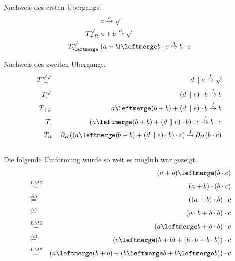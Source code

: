 \documentclass[10pt,a4paper,oneside,ngerman,numbers=noenddot]{scrartcl}
\begin{document}
    \subsection{}
    Nachweis des ersten Übergangs:
    \begin{alignat*}{2}
        &\; a \overset{a}{\rightarrow} \surd \\
        T^{\surd}_{+R} &\; a + b \overset{a}{\rightarrow} \surd \\
        T^{\surd}_{\leftmerge} &\; (a + b) \leftmerge b \cdot c \overset{a}{\rightarrow} b \cdot c
    \end{alignat*}

    Nachweis des zweiten Übergangs:
    \begin{alignat*}{2}
        T_{\parallel \gamma}^{\surd \surd} &&\; d \parallel e \overset{f}{\rightarrow} \surd \\
        T^{\surd}_{.} &&\; (d \parallel e) \cdot b \overset{f}{\rightarrow} b \\
        T_{+L} &&\; a \leftmerge (b + b) + (d \parallel e) \cdot b \overset{f}{\rightarrow} b \\
        T_{.} &&\; (a \leftmerge (b + b) + (d \parallel e) \cdot b) \cdot c \overset{f}{\rightarrow} b \cdot c \\
        T_{\partial} &&\; \partial_H((a \leftmerge (b + b) + (d \parallel e) \cdot b) \cdot c) \overset{f}{\rightarrow} \partial_H(b \cdot c)
    \end{alignat*}

    \subsection{}
    Die folgende Umformung wurde so weit es möglich war gezeigt.
    \begin{alignat*}{2}
        && (a + b) \leftmerge (b \cdot c) \\
        &\overset{LM2}{=}& (a + b) \cdot (b \cdot c) \\
        &\overset{A5}{=}& ((a + b) \cdot b) \cdot c \\
        &\overset{A4}{=}& (a \cdot b + b \cdot b) \cdot c \\
        &\overset{LM2}{=}& (a \leftmerge b + b \cdot b) \cdot c \\
        &\overset{A3}{=}& (a \leftmerge (b + b) + (b \cdot b + b \cdot b)) \cdot c \\
        &\overset{LM2}{=}& (a \leftmerge (b + b) + (b \leftmerge b + b \leftmerge b)) \cdot c
    \end{alignat*}
\end{document}
